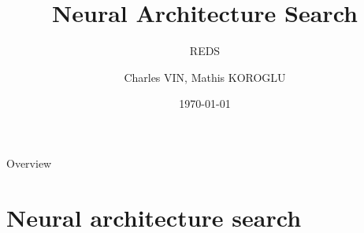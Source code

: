 \documentclass[aspectratio=169,xcolor=dvipsnames]{beamer}
\title[NAS]{Neural Architecture Search} %
\subtitle{REDS}
\author[Charles, Mathis] {Charles VIN, Mathis KOROGLU}
\institute[SU] %
{
    Sorbonne Université %
}
\date{\today} %
\begin{document}
\begin{frame}
    \titlepage
\end{frame}

\begin{frame}{Overview}
    \tableofcontents
\end{frame}

\section{Neural architecture search}
\end{document}
